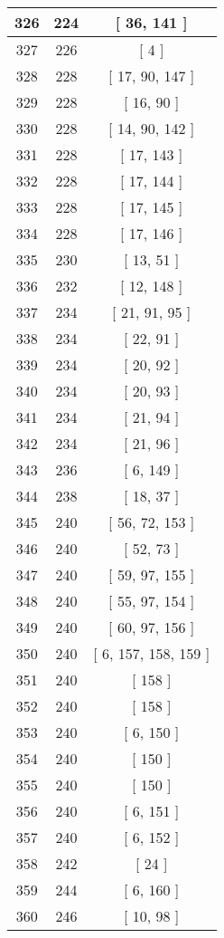 \begin{center}
\begin{longtable}[H]{|| c c c ||}
\hline
326 & 224 & [ 36, 141 ] \\ 
\hline
327 & 226 & [ 4 ] \\ 
\hline
328 & 228 & [ 17, 90, 147 ] \\ 
\hline
329 & 228 & [ 16, 90 ] \\ 
\hline
330 & 228 & [ 14, 90, 142 ] \\ 
\hline
331 & 228 & [ 17, 143 ] \\ 
\hline
332 & 228 & [ 17, 144 ] \\ 
\hline
333 & 228 & [ 17, 145 ] \\ 
\hline
334 & 228 & [ 17, 146 ] \\ 
\hline
335 & 230 & [ 13, 51 ] \\ 
\hline
336 & 232 & [ 12, 148 ] \\ 
\hline
337 & 234 & [ 21, 91, 95 ] \\ 
\hline
338 & 234 & [ 22, 91 ] \\ 
\hline
339 & 234 & [ 20, 92 ] \\ 
\hline
340 & 234 & [ 20, 93 ] \\ 
\hline
341 & 234 & [ 21, 94 ] \\ 
\hline
342 & 234 & [ 21, 96 ] \\ 
\hline
343 & 236 & [ 6, 149 ] \\ 
\hline
344 & 238 & [ 18, 37 ] \\ 
\hline
345 & 240 & [ 56, 72, 153 ] \\ 
\hline
346 & 240 & [ 52, 73 ] \\ 
\hline
347 & 240 & [ 59, 97, 155 ] \\ 
\hline
348 & 240 & [ 55, 97, 154 ] \\ 
\hline
349 & 240 & [ 60, 97, 156 ] \\ 
\hline
350 & 240 & [ 6, 157, 158, 159 ] \\ 
\hline
351 & 240 & [ 158 ] \\ 
\hline
352 & 240 & [ 158 ] \\ 
\hline
353 & 240 & [ 6, 150 ] \\ 
\hline
354 & 240 & [ 150 ] \\ 
\hline
355 & 240 & [ 150 ] \\ 
\hline
356 & 240 & [ 6, 151 ] \\ 
\hline
357 & 240 & [ 6, 152 ] \\ 
\hline
358 & 242 & [ 24 ] \\ 
\hline
359 & 244 & [ 6, 160 ] \\ 
\hline
360 & 246 & [ 10, 98 ] \\ 

\end{longtable}
\end{center}
